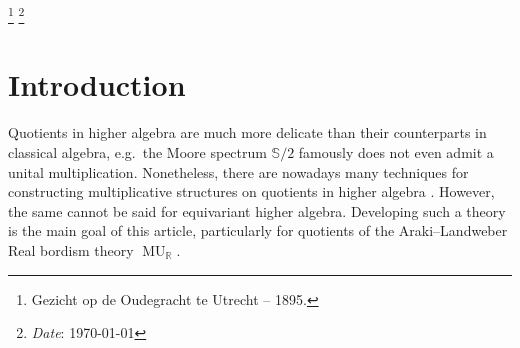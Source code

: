 \documentclass[a4paper, 10pt]{article}
\makeatletter
\newcommand{\Addresses}{{
  \bigskip
  \footnotesize

  R.~Quinn, \textsc{Utrecht Geometry Center, Universiteit Utrecht, The Netherlands}\\ \nopagebreak
  \textit{E-mail address}: \texttt{r.quinn@uu.nl}


  Q.~Zhu, \textsc{Max Planck Institute for Mathematics, Bonn, Germany}\\ \nopagebreak
  \textit{E-mail address}: \texttt{qzhu@mpim-bonn.mpg.de}

}}
\renewcommand{\S}{\mathbb S}
\newcommand{\MU}{\operatorname{MU}}
\newcommand{\MUR}{{\MU_{\mathbb{R}}}}
\theoremstyle{definition}
\makeatother
\begin{document}
\renewcommand\thefootnote{}%
\footnote{Gezicht op de Oudegracht te Utrecht -- 1895.}%
\footnote{\emph{Date}: \today}
\addtocounter{footnote}{-2}%
\endgroup
\thispagestyle{empty} %
\setcounter{tocdepth}{2}    %
\setcounter{secnumdepth}{4} %
\tableofcontents

\thispagestyle{empty}
\newpage
\section{Introduction}
Quotients in higher algebra are much more delicate than their counterparts in classical algebra, e.g.~the Moore spectrum $\S/2$ famously does not even admit a unital multiplication. Nonetheless, there are nowadays many techniques for constructing multiplicative structures on quotients in higher algebra  \cite{robinson1989obstruction, ekmm1997stablehomotopy,stricklandMU,lazarev2001homotopy, bakerJeanneret2002brave, duggerShipley2006postnikov, Angeltveit_2008,hopkinslurieambi,Basu_2017,hahn2018quotientsrings,hahnWilson2022redshift,burklund2022multiplicativestructuresmoorespectra, rognes2025localizationsequenceslogarithmictopological, willumsgaard2026obstructionsassociativitystablehomotopy}. However, the same cannot be said for equivariant higher algebra. Developing such a theory is the main goal of this article, particularly for quotients of the Araki--Landweber Real bordism theory $\MUR$.
\end{document}
